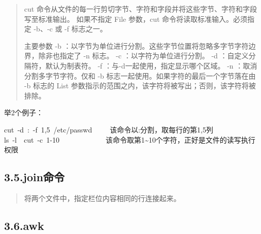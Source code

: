 \documentclass{article}
\begin{document}
\begin{quote}%

\noindent{}cut 命令从文件的每一行剪切字节、字符和字段并将这些字节、字符和字段写至标准输出。\mdbr
{}如果不指定 File 参数，cut 命令将读取标准输入。必须指定 -b、-c 或 -f 标志之一。%

主要参数\mdbr
{}-b ：以字节为单位进行分割。这些字节位置将忽略多字节字符边界，除非也指定了 -n 标志。\mdbr
{}-c ：以字符为单位进行分割。\mdbr
{}-d ：自定义分隔符，默认为制表符。\mdbr
{}-f ：与-d一起使用，指定显示哪个区域。 \mdbr
{}-n ：取消分割多字节字符。仅和 -b 标志一起使用。如果字符的最后一个字节落在由 -b 标志的 List 参数指示的范围之内，该字符将被写出；否则，该字符将被排除。 %
\end{quote}%

\noindent{}举2个例子：%
\begin{mdpre}%
\noindent{}cut~-d~:~-f~1,5~/etc/passwd~~~~~该命令以:分割，取每行的第1,5列\\
ls~-l~\textbar{}~cut~-c~1-10~~~~~~~~~~~~~该命令取第1\textasciitilde{}10个字符，正好是文件的读写执行权限%
\end{mdpre}
\subsection{3.5.\hspace*{0.5em}join命令}\label{sec-join}%

\begin{quote}%

\noindent{}将两个文件中，指定栏位内容相同的行连接起来。%
\end{quote}%

\subsection{3.6.\hspace*{0.5em}awk}\label{sec-awk}%
\end{document}
